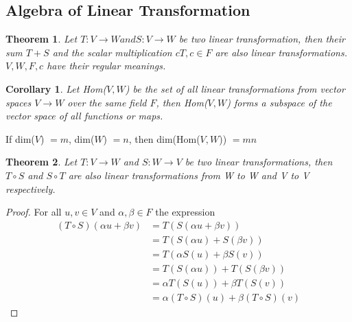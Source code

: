 \documentclass[a4paper, titlepage]{article}
\newtheorem{theorem}{Theorem}[section]
\newtheorem{corollary}{Corollary}[theorem]
\begin{document}
    \subsection{Algebra of Linear Transformation}
        \begin{theorem}
            Let $T: V \rightarrow W and S: V \rightarrow W$ be two linear
            transformation, then their sum $T + S$ and the scalar multiplication
            $cT, c \in F$ are also linear transformations. $V, W, F, c$ have 
            their regular meanings.
        \end{theorem}
        \begin{corollary}
            Let \textup{Hom($V, W$)} be the set of all linear transformations from vector
            spaces $V \rightarrow W$ over the same field $F$, then \textup{Hom($V, W$)} forms
            a subspace of the vector space of all functions or maps.
        \end{corollary}
        If dim($V$) $= m$, dim($W$) $= n$, then dim(Hom($V, W$)) $= mn$
        \begin{theorem}
            Let $T: V \rightarrow W$ and $S: W \rightarrow V$ be two linear
            transformations, then $T \circ S$ and $S \circ T$ are also linear
            transformations from W to W and V to V respectively.
        \end{theorem}
        \begin{proof}
            For all $u, v \in V$ and $\alpha, \beta \in F$ the expression
            \begin{align*}
                (T \circ S)(\alpha u + \beta v) &= T(S(\alpha u + \beta v)) \\
                                                &= T(S(\alpha u) + S(\beta v)) \\
                                                &= T(\alpha S(u) + \beta S(v)) \\
                                                &= T(S(\alpha u)) + T(S(\beta v)) \\
                                                &= \alpha T(S(u)) + \beta T(S(v)) \\
                                                &= \alpha (T \circ S)(u) + \beta (T \circ S)(v)
            \end{align*}
        \end{proof}
    
\end{document}
